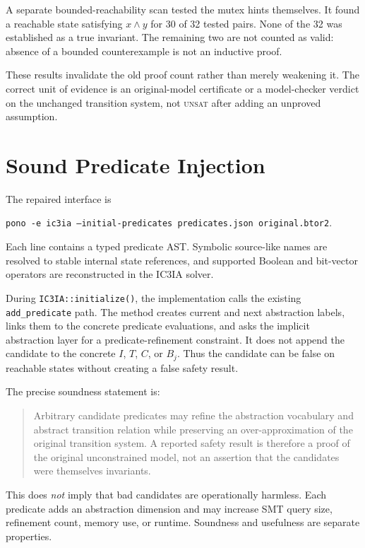 \documentclass[10pt]{article}
\newcommand{\icthreeia}{\textsc{IC3IA}}
\newcommand{\code}[1]{\texttt{#1}}
\newcommand{\unsat}{\textsc{unsat}}
\begin{document}
A separate bounded-reachability scan tested the mutex hints themselves.  It
found a reachable state satisfying $x\land y$ for 30 of 32 tested pairs.  None
of the 32 was established as a true invariant.  The remaining two are not
counted as valid: absence of a bounded counterexample is not an inductive
proof.

These results invalidate the old proof count rather than merely weakening it.
The correct unit of evidence is an original-model certificate or a model-checker
verdict on the unchanged transition system, not \unsat{} after adding an
unproved assumption.

\section{Sound Predicate Injection}
\label{sec:repair}

The repaired interface is
\begin{center}
\code{pono -e ic3ia --initial-predicates predicates.json original.btor2}.
\end{center}
Each line contains a typed predicate AST.  Symbolic source-like names are
resolved to stable internal state references, and supported Boolean and
bit-vector operators are reconstructed in the \icthreeia{} solver.

During \code{IC3IA::initialize()}, the implementation calls the existing
\code{add\_predicate} path.  The method creates current and next abstraction
labels, links them to the concrete predicate evaluations, and asks the implicit
abstraction layer for a predicate-refinement constraint.  It does not append
the candidate to the concrete $I$, $T$, $C$, or $B_j$.  Thus the candidate can
be false on reachable states without creating a false safety result.

The precise soundness statement is:
\begin{quote}
Arbitrary candidate predicates may refine the abstraction vocabulary and
abstract transition relation while preserving an over-approximation of the
original transition system.  A reported safety result is therefore a proof of
the original unconstrained model, not an assertion that the candidates were
themselves invariants.
\end{quote}

This does \emph{not} imply that bad candidates are operationally harmless.
Each predicate adds an abstraction dimension and may increase SMT query size,
refinement count, memory use, or runtime.  Soundness and usefulness are
separate properties.
\end{document}
